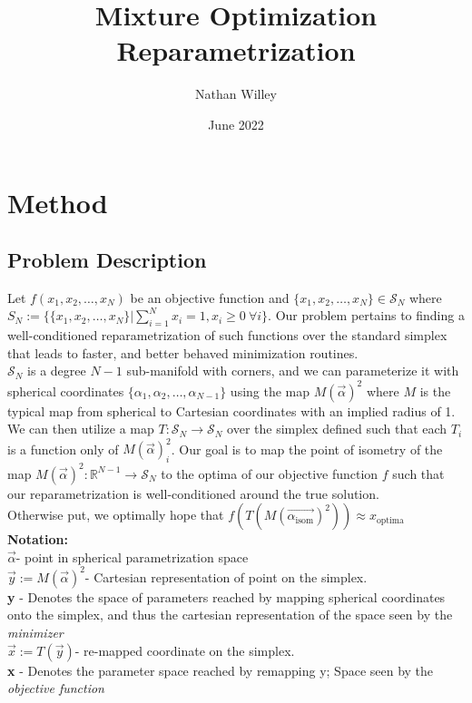 \documentclass[10pt]{article}
\title{Mixture Optimization Reparametrization}
\author{Nathan Willey}
\date{June 2022}
\begin{document}
\maketitle

\tableofcontents
\newpage 

\section{Method}

\subsection{Problem Description}
Let $f(x_1, x_2, \dots, x_N)$ be an objective function and $\{x_1, x_2, \dots, x_N\} \in \mathcal{S}_N$ where $S_N := \{\{x_1, x_2, \dots, x_N\} | \sum_{i=1}^N x_i = 1, x_i \geq 0 \ \forall i\}$. Our problem pertains to finding a well-conditioned reparametrization of such functions over the standard simplex that leads to faster, and better behaved minimization routines. \\

$\mathcal{S}_N$ is a degree $N-1$ sub-manifold with corners, and we can parameterize it with spherical coordinates $\{ \alpha_1, \alpha_2, \dots, \alpha_{N-1}\}$ using the map $M(\vec{\alpha})^2$ where $M$ is the typical map from spherical to Cartesian coordinates with an implied radius of 1. \\ We can then utilize a map $T: \mathcal{S}_N \to \mathcal{S}_N$ over the simplex defined such that each $T_i$ is a function only of $M(\vec{\alpha})^2_i$. Our goal is to map the point of isometry of the map $M(\vec{\alpha})^2: \mathbb{R}^{N-1} \to \mathcal{S}_N$ to the optima of our objective function $f$ such that our reparametrization is well-conditioned around the true solution.\\ Otherwise put, we optimally hope that $f(T(M(\vec{\alpha_{\text{isom}}})^2)) \approx x_{\text{optima}}$\\ 

\textbf{Notation: } \\ $\vec{\alpha}$- point in spherical parametrization space \\  
$\vec{y} := M(\vec{\alpha})^2$- Cartesian representation of point on the simplex. \\
\textbf{y} - Denotes the space of parameters reached by mapping spherical coordinates onto the simplex, and thus the cartesian representation of the space seen by the \textit{minimizer}\\
$\vec{x} := T(\vec{y})$- re-mapped coordinate on the simplex. \\
\textbf{x} - Denotes the parameter space reached by remapping y; Space seen by the \textit{objective function}\\
\end{document}
